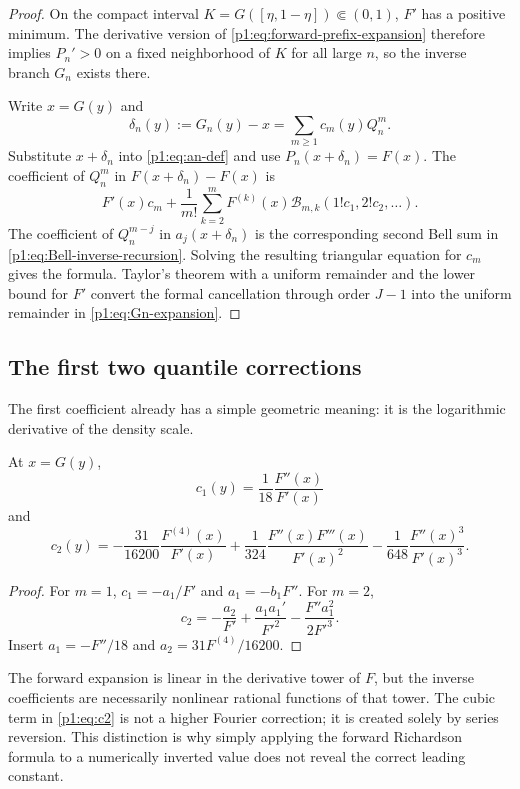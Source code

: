 \documentclass[11pt,oneside]{article}
\numberwithin{equation}{section}
\theoremstyle{definition}
\theoremstyle{remark}
\newcommand{\InvF}{G}
\newcommand{\Fn}{P_n}
\newcommand{\Gn}{G_n}
\begin{document}
\begin{proof}
On the compact interval $K=\InvF([\eta,1-\eta])\Subset(0,1)$, $F'$ has a
positive minimum.  The derivative version of \eqref{p1:eq:forward-prefix-expansion}
therefore implies $\Fn'>0$ on a fixed neighborhood of $K$ for all large $n$,
so the inverse branch $\Gn$ exists there.

Write $x=\InvF(y)$ and
\[
 \delta_n(y):=\Gn(y)-x=\sum_{m\ge1}c_m(y)Q_n^m.
\]
Substitute $x+\delta_n$ into \eqref{p1:eq:an-def} and use
$\Fn(x+\delta_n)=F(x)$.  The coefficient of $Q_n^m$ in
$F(x+\delta_n)-F(x)$ is
\[
 F'(x)c_m+\frac1{m!}\sum_{k=2}^{m}F^{(k)}(x)
 \mathcal B_{m,k}(1!c_1,2!c_2,\ldots).
\]
The coefficient of $Q_n^{m-j}$ in $a_j(x+\delta_n)$ is the corresponding
second Bell sum in \eqref{p1:eq:Bell-inverse-recursion}.  Solving the resulting
triangular equation for $c_m$ gives the formula.  Taylor's theorem with a
uniform remainder and the lower bound for $F'$ convert the formal cancellation
through order $J-1$ into the uniform remainder in \eqref{p1:eq:Gn-expansion}.
\end{proof}

\subsection{The first two quantile corrections}

The first coefficient already has a simple geometric meaning: it is the logarithmic
derivative of the density scale.

\begin{corollary}
\label{p1:cor:c1-c2}
At $x=\InvF(y)$,
\begin{equation}
 \boxed{c_1(y)=\frac1{18}\frac{F''(x)}{F'(x)}}
 \label{p1:eq:c1}
\end{equation}
and
\begin{equation}
 \boxed{
 c_2(y)=
 -\frac{31}{16200}\frac{F^{(4)}(x)}{F'(x)}
 +\frac1{324}\frac{F''(x)F'''(x)}{F'(x)^2}
 -\frac1{648}\frac{F''(x)^3}{F'(x)^3}.}
 \label{p1:eq:c2}
\end{equation}
\end{corollary}

\begin{proof}
For $m=1$, $c_1=-a_1/F'$ and $a_1=-b_1F''$.  For $m=2$,
\[
 c_2=-\frac{a_2}{F'}+\frac{a_1a_1'}{F'^2}
 -\frac{F''a_1^2}{2F'^3}.
\]
Insert $a_1=-F''/18$ and $a_2=31F^{(4)}/16200$.
\end{proof}

\begin{remark}
The forward expansion is linear in the derivative tower of $F$, but the inverse
coefficients are necessarily nonlinear rational functions of that tower.  The cubic
term in \eqref{p1:eq:c2} is not a higher Fourier correction; it is created solely by
series reversion.  This distinction is why simply applying the forward Richardson
formula to a numerically inverted value does not reveal the correct leading constant.
\end{remark}
\end{document}
